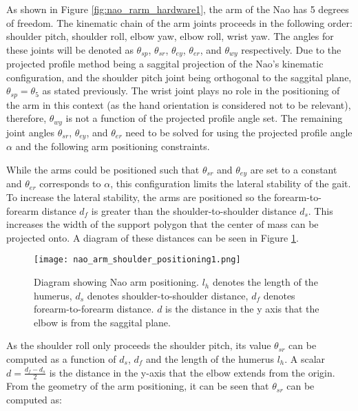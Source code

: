 As shown in Figure \ref{fig:nao_rarm_hardware1}, the arm of the Nao has 5 degrees of freedom.
The kinematic chain of the arm joints proceeds in the following order: shoulder pitch, shoulder
roll, elbow yaw, elbow roll, wrist yaw. The angles for these joints will be denoted as $\theta_{sp}$,
$\theta_{sr}$, $\theta_{ey}$, $\theta_{er}$, and $\theta_{wy}$ respectively. Due to the projected profile
method being a saggital projection of the Nao's kinematic configuration, and the shoulder pitch joint
being orthogonal to the saggital plane, $\theta_{sp} = \theta_5$ as stated previously. The wrist
joint plays no role in the positioning of the arm in this context (as the hand orientation is considered
not to be relevant), therefore, $\theta_{wy}$ is not a function of the projected profile angle set.
The remaining joint angles $\theta_{sr}$, $\theta_{ey}$, and $\theta_{er}$ 
need to be solved for using the projected profile angle $\alpha$ and the following arm positioning 
constraints.

While the arms could be positioned such that $\theta_{sr}$ and $\theta_{ey}$ are set to a constant
and $\theta_{er}$ corresponds to $\alpha$, this configuration limits the lateral stability of the
gait. To increase the lateral stability, the arms are positioned so the forearm-to-forearm distance $d_f$
is greater than the shoulder-to-shoulder distance $d_s$. This increases the width of the support polygon 
that the center of mass can be projected onto. A diagram of these distances can be seen in 
Figure \ref{fig:nao_arm_pose1}.

\begin{figure}
	\texttt{[image: nao\_arm\_shoulder\_positioning1.png]}
  	\caption{Diagram showing Nao arm positioning. 
  					 $l_h$ denotes the length of the humerus,
  					 $d_s$ denotes shoulder-to-shoulder distance,
  					 $d_f$ denotes forearm-to-forearm distance.
  					 $d$ is the distance in the y axis that the elbow is from the saggital plane.
  				  }
  	\label{fig:nao_arm_pose1}
\end{figure}


As the shoulder roll only proceeds the shoulder pitch, its value $\theta_{sr}$ can be computed as a function
of $d_s$, $d_f$ and the length of the humerus $l_h$. A scalar $d = \frac{d_f - d_s}{2}$ is
the distance in the y-axis that the elbow extends from the origin.
From the geometry of the arm positioning, it can be seen that $\theta_{sr}$ can be computed as:

